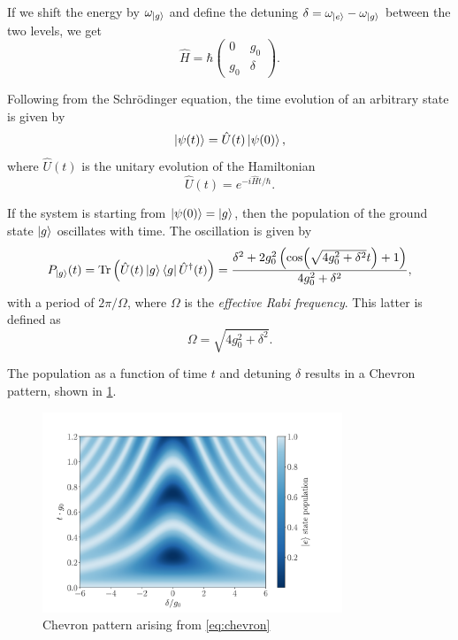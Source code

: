 If we shift the energy by $\omega_{\ket{g}}$ and define the detuning $\delta = \omega_{\ket{e}} - \omega_{\ket{g}}$ between the two levels, we get
\begin{equation}
\label{eq:JC-Chevron}
    \hat{H} = \hbar
    \begin{pmatrix}
        0       & g_0       \\
        g_0   & \delta  
    \end{pmatrix}  .
\end{equation}

Following from the Schrödinger equation, the time evolution of an arbitrary state is given by 
\begin{equation}
    \ket{\psi ( t )} = \hat{U}(t) \ket{\psi(0)} ,
\end{equation}
where $\hat{U}(t)$ is the unitary evolution of the Hamiltonian
\begin{equation}
    \hat{U}(t) = e^{-i \hat{H} t / \hbar} .
\end{equation}

If the system is starting from $\ket{\psi(0)} = \ket{g}$, then the population of the ground state $\ket{g}$ oscillates with time.
The oscillation is given by \cite{Lacroix}
\begin{equation}
\label{eq:chevron}
    P_{\ket{g}} (t) = \Tr \left( \hat{U}(t) \ket{g} \bra{g} \hat{U}^\dagger (t) \right) = 
    \frac{\delta^2 + 2 g_0^2 
    \left( \cos(\sqrt{4 g_0^2 + \delta^2} t) + 1 \right)}{4 g_0^2 + \delta^2} ,
\end{equation}
with a period of $2 \pi / \Omega$, where $\Omega$ is the \emph{effective Rabi frequency}.
This latter is defined as
\begin{equation}
    \Omega = \sqrt{4 g_0^2 + \delta^2} .
\end{equation}

The population as a function of time $t$ and detuning $\delta$ results in a Chevron pattern, shown in \cref{fig:Chevron}.

\begin{figure}
    \centering
    \includegraphics[width = 0.8\textwidth]{Images/Chap3/Chevron.pdf}
    \caption{Chevron pattern arising from \cref{eq:chevron}}
    \label{fig:Chevron}
\end{figure}

